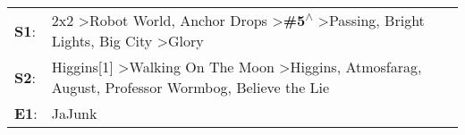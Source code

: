 \begin{supertabular}{p{0.03\textwidth}p{0.92\textwidth}}
 \textbf{S1}:  &  2x2\textsuperscript{} \textgreater \enspace Robot World\textsuperscript{}, \enspace Anchor Drops\textsuperscript{} \textgreater \enspace \textbf{\#5\textsuperscript{$\wedge$}} \textgreater \enspace Passing\textsuperscript{}, \enspace Bright Lights, Big City\textsuperscript{} \textgreater \enspace Glory\textsuperscript{}  \enspace  \\
 \textbf{S2}:  &                       Higgins[1]\textsuperscript{} \textgreater \enspace Walking On The Moon\textsuperscript{} \textgreater \enspace Higgins\textsuperscript{}, \enspace Atmosfarag\textsuperscript{}, \enspace August\textsuperscript{}, \enspace Professor Wormbog\textsuperscript{}, \enspace Believe the Lie\textsuperscript{}  \enspace  \\
 \textbf{E1}:  &                                                                                                                                                                                                                                                                                                           JaJunk\textsuperscript{}  \enspace  \\
\end{supertabular}

